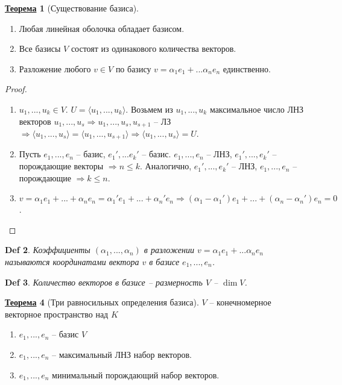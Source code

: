 \documentclass[12pt]{article}
\newenvironment{MyList}[1][4pt]{
  \begin{enumerate}[1.]
  \setlength{\parskip}{0pt}
  \setlength{\itemsep}{#1}
}{       
  \end{enumerate}
}
\def\SO{\Rightarrow}     %
\theoremstyle{definition} %
\newtheorem{Thm}{\underline{Теорема}}[subsection] %
\theoremstyle{plain} %
\newtheorem{Def}[Thm]{Def} %
\theoremstyle{remark} %
\begin{document}
{\begin{Thm}[Существование базиса]
    \begin{MyList}
        \item Любая линейная оболочка обладает базисом.
        \item Все базисы $V$ состоят из одинакового количества векторов.
        \item Разложение любого $v \in V$ по базису $v = \alpha_1 e_1 + ... \alpha_n e_n$ единственно.
    \end{MyList}
\end{Thm}

\begin{proof}
    \begin{MyList}
        \item $u_1, ..., u_k \in V$. $U = \langle u_1, ..., u_k\rangle$. Возьмем из $u_1, ..., u_k$ максимальное число ЛНЗ векторов $u_1, ..., u_s \SO u_1, ..., u_s, u_{s + 1}$ -- ЛЗ $\SO \langle u_1, ..., u_s\rangle = \langle u_1, ..., u_{s + 1}\rangle \SO \langle u_1, ..., u_s\rangle = U$.  
        \item Пусть $e_1, ..., e_n$ -- базис, $e_1', ... e_k'$ -- базис.
        $e_1, ..., e_n$ -- ЛНЗ, $e_1', ..., e_k'$ -- порождающие векторы $\SO n \leqslant k$.
        Аналогично, $e_1', ..., e_k'$ -- ЛНЗ, $e_1, ..., e_n$ -- порождающие $\SO k\leqslant n$.
        
        \item $v = \alpha_1 e_1 + ... + \alpha_n e_n = \alpha_1' e_1 + ... + \alpha_n'e_n \SO (\alpha_1 - \alpha_1') e_1 + ... + (\alpha_n - \alpha_n')e_n = 0$. 
    \end{MyList}
\end{proof}

\begin{Def}
    Коэффициенты $(\alpha_1, ..., \alpha_n)$ в разложении $v = \alpha_1 e_1 + ... \alpha_n e_n$ называются координатами вектора $v$ в базисе $e_1, ..., e_n$. 
\end{Def}

\begin{Def}
    Количество векторов в базисе -- размерность $V$ -- $\dim V$.
\end{Def}

\begin{Thm}[Три равносильных определения базиса]
    $V$ -- конечномерное векторное пространство над $K$
    \begin{MyList}
        \item $e_1, ..., e_n$ -- базис $V$
        \item $e_1, ..., e_n$ -- максимальный ЛНЗ набор векторов.
        \item $e_1, ..., e_n$ минимальный порождающий набор векторов.
    \end{MyList}
\end{Thm}

}
\end{document}
